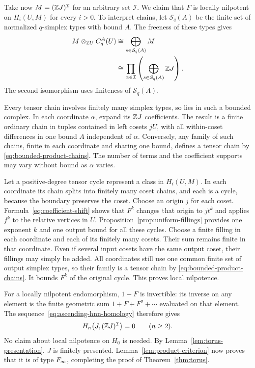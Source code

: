 Take now $M=(\mathbb Z J)^{\mathcal I}$ for an arbitrary set $\mathcal I$.
We claim that $F$ is locally nilpotent on $H_i(U,M)$ for every $i>0$.
To interpret chains, let $\mathcal S_q(A)$ be the finite set of
normalized $q$-simplex types with bound $A$.  The freeness of these
types gives
\begin{equation}\label{eq:bounded-product-chains}
 \begin{split}
 M\otimes_{\mathbb Z U}C_q^A(U)
 &\cong\bigoplus_{s\in\mathcal S_q(A)} M\\
 &\cong\prod_{\alpha\in\mathcal I}
       \left(\bigoplus_{s\in\mathcal S_q(A)}\mathbb Z J\right).
 \end{split}
\end{equation}
The second isomorphism uses finiteness of $\mathcal S_q(A)$.

Every tensor chain involves finitely many simplex types, so lies in
such a bounded complex.  In each coordinate $\alpha$, expand its
$\mathbb Z J$ coefficients.  The result is a finite ordinary chain in
tuples contained in left cosets $jU$, with all within-coset differences
in one bound $A$ independent of $\alpha$.  Conversely, any family of
such chains, finite in each coordinate and sharing one bound, defines
a tensor chain by \eqref{eq:bounded-product-chains}.  The number of
terms and the coefficient supports may vary without bound as
$\alpha$ varies.

Let a positive-degree tensor cycle represent a class in $H_i(U,M)$.
In each coordinate its chain splits into finitely many coset chains,
and each is a cycle, because the boundary preserves the coset.
Choose an origin $j$ for each coset.  Formula~\eqref{eq:coefficient-shift}
shows that $F^k$ changes that origin to $jt^k$ and applies $f^k$ to
the relative vertices in $U$.  Proposition~\ref{prop:uniform-fillings}
provides one exponent $k$ and one output bound for all these cycles.
Choose a finite filling in each coordinate and each of its finitely
many cosets.  Their sum remains finite in that coordinate.  Even if
several input cosets have the same output coset, their fillings may
simply be added.  All coordinates still use one common finite set of
output simplex types, so their family is a tensor chain by
\eqref{eq:bounded-product-chains}.  It bounds $F^k$ of the original
cycle.  This proves local nilpotence.

For a locally nilpotent endomorphism, $1-F$ is invertible: its inverse
on any element is the finite geometric sum $1+F+F^2+\cdots$ evaluated
on that element.  The sequence~\eqref{eq:ascending-hnn-homology}
therefore gives
\[
 H_n\bigl(J,(\mathbb Z J)^{\mathcal I}\bigr)=0
       \qquad(n\ge2).
\]
No claim about local nilpotence on $H_0$ is needed.  By
Lemma~\ref{lem:torus-presentation}, $J$ is finitely presented.
Lemma~\ref{lem:product-criterion} now proves that it is of type
$F_\infty$, completing the proof of Theorem~\ref{thm:torus}.

